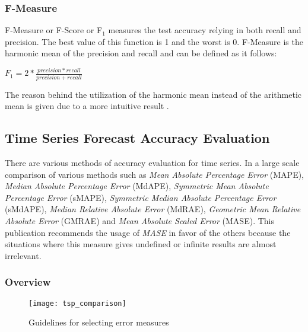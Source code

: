 \subsubsection{F-Measure}

F-Measure or F-Score or F\begin{math}_1 \end{math} measures the test accuracy
  relying in both recall and precision. The best value of this function is 1 and
  the worst is 0. F-Measure is the harmonic mean of the precision and recall and
  can be defined as it follows:

\begin{center} \Large \begin{math} F_1 = 2 *
\frac{precision*recall}{precision+recall} \end{math} \normalsize \end{center}

The reason behind the utilization of the harmonic mean instead of the arithmetic
mean is given due to a more intuitive result \cite{sasaki2007truth}. \\

\subsection{Time Series Forecast Accuracy Evaluation}

There are various methods of accuracy evaluation for time series. In
\cite{Hyndman2006679} a large scale comparison of various methods such as
\emph{Mean Absolute Percentage Error} (MAPE), \emph{Median Absolute Percentage
Error} (MdAPE), \emph{Symmetric Mean Absolute Percentage Error} (sMAPE),
\emph{Symmetric Median Absolute Percentage Error} (sMdAPE), \emph{Median
Relative Absolute Error} (MdRAE), \emph{Geometric Mean Relative Absolute
Error} (GMRAE) and \emph{Mean Absolute Scaled Error} (MASE). This publication
recommends the usage of \emph{MASE} in favor of the others because the
situations where this measure gives undefined or infinite results are almost
irrelevant.

\subsubsection{Overview}
\begin{figure}[h] \begin{center} \leavevmode
\texttt{[image: tsp\_comparison]} \caption{Guidelines for
selecting error measures \cite{Armstrong199269} } \label{fig:ts_error_selection}
\end{center} \end{figure}

